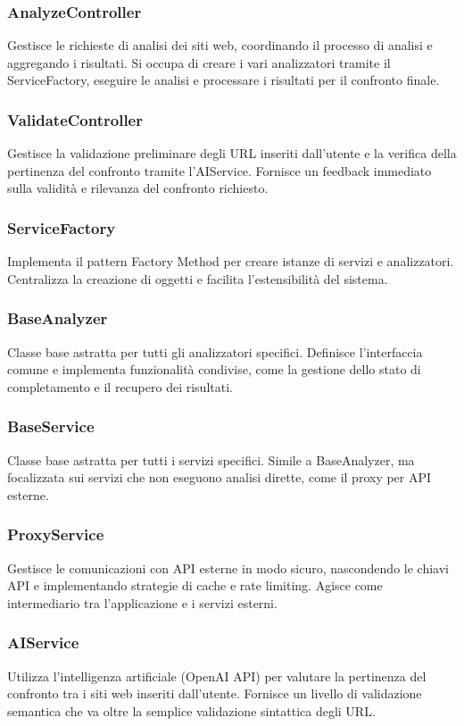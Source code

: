 \subsubsection{AnalyzeController}
Gestisce le richieste di analisi dei siti web, coordinando il processo di analisi e aggregando i risultati. Si occupa di creare i vari analizzatori tramite il ServiceFactory, eseguire le analisi e processare i risultati per il confronto finale.

\subsubsection{ValidateController}
Gestisce la validazione preliminare degli URL inseriti dall'utente e la verifica della pertinenza del confronto tramite l'AIService. Fornisce un feedback immediato sulla validità e rilevanza del confronto richiesto.

\subsubsection{ServiceFactory}
Implementa il pattern Factory Method per creare istanze di servizi e analizzatori. Centralizza la creazione di oggetti e facilita l'estensibilità del sistema.

\subsubsection{BaseAnalyzer}
Classe base astratta per tutti gli analizzatori specifici. Definisce l'interfaccia comune e implementa funzionalità condivise, come la gestione dello stato di completamento e il recupero dei risultati.

\subsubsection{BaseService}
Classe base astratta per tutti i servizi specifici. Simile a BaseAnalyzer, ma focalizzata sui servizi che non eseguono analisi dirette, come il proxy per API esterne.

\subsubsection{ProxyService}
Gestisce le comunicazioni con API esterne in modo sicuro, nascondendo le chiavi API e implementando strategie di cache e rate limiting. Agisce come intermediario tra l'applicazione e i servizi esterni.

\subsubsection{AIService}
Utilizza l'intelligenza artificiale (OpenAI API) per valutare la pertinenza del confronto tra i siti web inseriti dall'utente. Fornisce un livello di validazione semantica che va oltre la semplice validazione sintattica degli URL.

